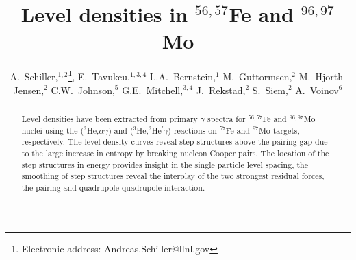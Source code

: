 \draft



\title{Level densities in $^{56,57}$Fe and $^{96,97}$Mo}
\author{A.~Schiller,$^{1,2}$\footnote{Electronic address: 
Andreas.Schiller@llnl.gov}, E.~Tavukcu,$^{1,3,4}$ L.A.~Bernstein,$^1$ 
M.~Guttormsen,$^2$ M.~Hjorth-Jensen,$^2$ C.W.~Johnson,$^5$ 
G.E.~Mitchell,$^{3,4}$ J.~Rekstad,$^2$ S.~Siem,$^2$ A.~Voinov$^6$}
\address{$^1$ Lawrence Livermore National Laboratory, L-414, 7000 East Avenue, 
Livermore, California 94551, USA}
\address{$^2$ Department of Physics, University of Oslo, N-0316 Oslo, Norway}
\address{$^3$ North Carolina State University, Raleigh, North Carolina 27695, 
USA}
\address{$^4$ Triangle Universities Nuclear Laboratory, Durham, North Carolina 
27708, USA}
\address{$^5$ San Diego State University, San Diego, California 92182, USA}
\address{$^6$ Frank Laboratory of Neutron Physics, Joint Institute of Nuclear 
Research, 141980 Dubna, Moscow region, Russia}

\maketitle

\begin{abstract}
Level densities have been extracted from primary $\gamma$ spectra for 
$^{56,57}$Fe and $^{96,97}$Mo nuclei using the ($^3$He,$\alpha\gamma$) and
($^3$He,$^3$He$^\prime\gamma$) reactions on $^{57}$Fe and $^{97}$Mo targets,
respectively. The level density curves reveal step structures above the pairing
gap due to the large increase in entropy by breaking nucleon Cooper pairs. The
location of the step structures in energy provides insight in the single 
particle level spacing, the smoothing of step structures reveal the interplay 
of the two strongest residual forces, the pairing and quadrupole-quadrupole 
interaction.
\end{abstract}


